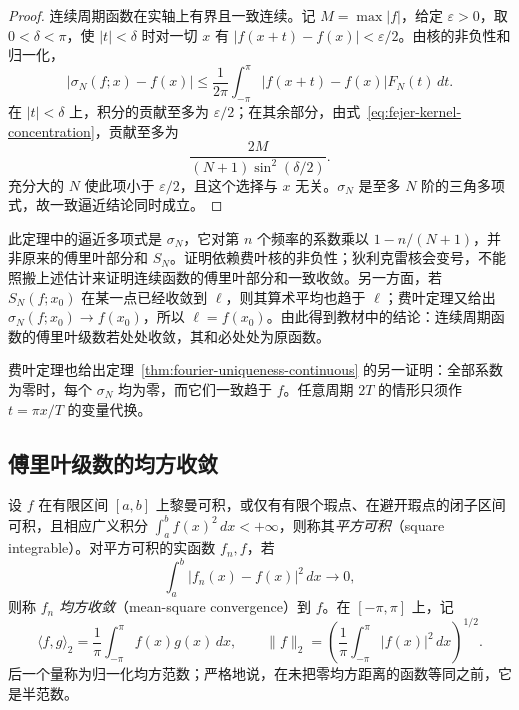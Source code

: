 \documentclass[UTF8,12pt,a4paper,fontset=fandol]{ctexbook}
\begin{document}
\begin{proof}
连续周期函数在实轴上有界且一致连续。记 $M=\max|f|$，给定 $\varepsilon>0$，取 $0<\delta<\pi$，使 $|t|<\delta$ 时对一切 $x$ 有 $|f(x+t)-f(x)|<\varepsilon/2$。由核的非负性和归一化，
\[
    |\sigma_N(f;x)-f(x)|
       \leq\frac1{2\pi}\int_{-\pi}^{\pi}
                  |f(x+t)-f(x)|F_N(t)\,dt.
\]
在 $|t|<\delta$ 上，积分的贡献至多为 $\varepsilon/2$；在其余部分，由式~\eqref{eq:fejer-kernel-concentration}，贡献至多为
\[
    \frac{2M}{(N+1)\sin^2(\delta/2)}.
\]
充分大的 $N$ 使此项小于 $\varepsilon/2$，且这个选择与 $x$ 无关。$\sigma_N$ 是至多 $N$ 阶的三角多项式，故一致逼近结论同时成立。
\end{proof}

此定理中的逼近多项式是 $\sigma_N$，它对第 $n$ 个频率的系数乘以 $1-n/(N+1)$，并非原来的傅里叶部分和 $S_N$。证明依赖费叶核的非负性；狄利克雷核会变号，不能照搬上述估计来证明连续函数的傅里叶部分和一致收敛。另一方面，若 $S_N(f;x_0)$ 在某一点已经收敛到 $\ell$，则其算术平均也趋于 $\ell$；费叶定理又给出 $\sigma_N(f;x_0)\to f(x_0)$，所以 $\ell=f(x_0)$。由此得到教材中的结论：连续周期函数的傅里叶级数若处处收敛，其和必处处为原函数。

费叶定理也给出定理~\ref{thm:fourier-uniqueness-continuous} 的另一证明：全部系数为零时，每个 $\sigma_N$ 均为零，而它们一致趋于 $f$。任意周期 $2T$ 的情形只须作 $t=\pi x/T$ 的变量代换。

\subsection{傅里叶级数的均方收敛}
\label{subsec:mean-square-convergence-of-fourier-series}

\begin{definition}
\label{def:mean-square-convergence}
设 $f$ 在有限区间 $[a,b]$ 上黎曼可积，或仅有有限个瑕点、在避开瑕点的闭子区间可积，且相应广义积分 $\int_a^bf(x)^2\,dx<+\infty$，则称其\emph{平方可积}（square integrable）。对平方可积的实函数 $f_n,f$，若
\[
    \int_a^b|f_n(x)-f(x)|^2\,dx\longrightarrow0,
\]
则称 $f_n$ \emph{均方收敛}（mean-square convergence）到 $f$。在 $[-\pi,\pi]$ 上，记
\begin{equation}
    \langle f,g\rangle_2=\frac1\pi\int_{-\pi}^{\pi}f(x)g(x)\,dx,
    \qquad \|f\|_2=\left(\frac1\pi\int_{-\pi}^{\pi}|f(x)|^2\,dx\right)^{1/2}.
    \label{eq:normalized-square-integral}
\end{equation}
后一个量称为归一化均方范数；严格地说，在未把零均方距离的函数等同之前，它是半范数。
\end{definition}
\end{document}
